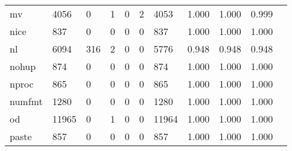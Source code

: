 \begin{longtable}{lp{1.10cm}p{1.10cm}p{1.10cm}p{1.10cm}p{1.10cm}p{1.10cm}p{1.10cm}p{1.10cm}p{1.10cm}p{1.10cm}}
mv        &                   4056 &                                  0 &                                 1 &                                0 &                                 2 &                            4053 &                             1.000 &                                 1.000 &                               0.999 \\
nice      &                    837 &                                  0 &                                 0 &                                0 &                                 0 &                             837 &                             1.000 &                                 1.000 &                               1.000 \\
nl        &                   6094 &                                316 &                                 2 &                                0 &                                 0 &                            5776 &                             0.948 &                                 0.948 &                               0.948 \\
nohup     &                    874 &                                  0 &                                 0 &                                0 &                                 0 &                             874 &                             1.000 &                                 1.000 &                               1.000 \\
nproc     &                    865 &                                  0 &                                 0 &                                0 &                                 0 &                             865 &                             1.000 &                                 1.000 &                               1.000 \\
numfmt    &                   1280 &                                  0 &                                 0 &                                0 &                                 0 &                            1280 &                             1.000 &                                 1.000 &                               1.000 \\
od        &                  11965 &                                  0 &                                 1 &                                0 &                                 0 &                           11964 &                             1.000 &                                 1.000 &                               1.000 \\
paste     &                    857 &                                  0 &                                 0 &                                0 &                                 0 &                             857 &                             1.000 &                                 1.000 &                               1.000 \\

\end{longtable}
